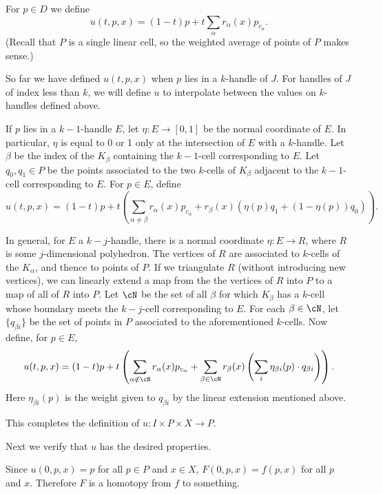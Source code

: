 \documentclass[11pt,leqno]{article}
\newcommand{\eq}[1]{\begin{displaymath}#1\end{displaymath}}
\begin{document}
For $p \in D$ we define
\eq{
	u(t, p, x) = (1-t)p + t \sum_\alpha r_\alpha(x) p_{c_\alpha} .
}
(Recall that $P$ is a single linear cell, so the weighted average of points of $P$
makes sense.)

So far we have defined $u(t, p, x)$ when $p$ lies in a $k$-handle of $J$.
For handles of $J$ of index less than $k$, we will define $u$ to 
interpolate between the values on $k$-handles defined above.

If $p$ lies in a $k{-}1$-handle $E$, let $\eta : E \to [0,1]$ be the normal coordinate 
of $E$.
In particular, $\eta$ is equal to 0 or 1 only at the intersection of $E$
with a $k$-handle.
Let $\beta$ be the index of the $K_\beta$ containing the $k{-}1$-cell
corresponding to $E$.
Let $q_0, q_1 \in P$ be the points associated to the two $k$-cells of $K_\beta$
adjacent to the $k{-}1$-cell corresponding to $E$.
For $p \in E$, define
\eq{
	u(t, p, x) = (1-t)p + t \left( \sum_{\alpha \ne \beta} r_\alpha(x) p_{c_\alpha}
			+ r_\beta(x) (\eta(p) q_1 + (1-\eta(p)) q_0) \right) .
}

In general, for $E$ a $k{-}j$-handle, there is a normal coordinate
$\eta: E \to R$, where $R$ is some $j$-dimensional polyhedron.
The vertices of $R$ are associated to $k$-cells of the $K_\alpha$, and thence to points of $P$.
If we triangulate $R$ (without introducing new vertices), we can linearly extend
a map from the the vertices of $R$ into $P$ to a map of all of $R$ into $P$.
Let $\cN$ be the set of all $\beta$ for which $K_\beta$ has a $k$-cell whose boundary meets
the $k{-}j$-cell corresponding to $E$.
For each $\beta \in \cN$, let $\{q_{\beta i}\}$ be the set of points in $P$ associated to the aforementioned $k$-cells.
Now define, for $p \in E$,
\eq{
	u(t, p, x) = (1-t)p + t \left( 
			\sum_{\alpha \notin \cN} r_\alpha(x) p_{c_\alpha}
				+ \sum_{\beta \in \cN} r_\beta(x) \left( \sum_i \eta_{\beta i}(p) \cdot q_{\beta i} \right)
			 \right) .
}
Here $\eta_{\beta i}(p)$ is the weight given to $q_{\beta i}$ by the linear extension
mentioned above.

This completes the definition of $u: I \times P \times X \to P$.

\medskip

Next we verify that $u$ has the desired properties.

Since $u(0, p, x) = p$ for all $p\in P$ and $x\in X$, $F(0, p, x) = f(p, x)$ for all $p$ and $x$.
Therefore $F$ is a homotopy from $f$ to something.
\end{document}
